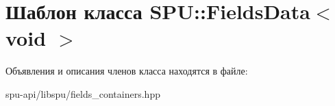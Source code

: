 \hypertarget{class_s_p_u_1_1_fields_data_3_01void_01_4}{}\section{Шаблон класса S\+PU\+:\+:Fields\+Data$<$ void $>$}
\label{class_s_p_u_1_1_fields_data_3_01void_01_4}


Объявления и описания членов класса находятся в файле\+:\begin{DoxyCompactItemize}
\item 
spu-\/api/libspu/fields\+\_\+containers.\+hpp\end{DoxyCompactItemize}
